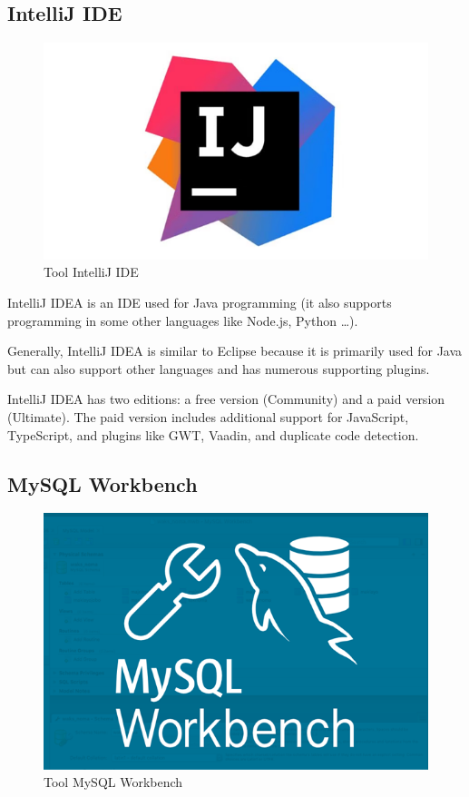 \documentclass[../Main.tex]{subfiles}
\begin{document}
\subsection{IntelliJ IDE}
\begin{figure}[H]
    \centering
    \includegraphics[width=\textwidth]{Figure/Picture4.png}
    \caption{Tool IntelliJ IDE}
    \label{fig:ide}
\end{figure}
IntelliJ IDEA is an IDE used for Java programming (it also supports programming in some other languages like Node.js, Python \dots).

Generally, IntelliJ IDEA is similar to Eclipse because it is primarily used for Java but can also support other languages and has numerous supporting plugins.

IntelliJ IDEA has two editions: a free version (Community) and a paid version (Ultimate).
The paid version includes additional support for JavaScript, TypeScript, and plugins like GWT, Vaadin, and duplicate code detection.

\subsection{MySQL Workbench}

\begin{figure}[H]
    \centering
    \includegraphics[width=\textwidth]{Figure/Picture5.png}
    \caption{Tool MySQL Workbench}
    \label{fig:mySQL}
\end{figure}
\end{document}
